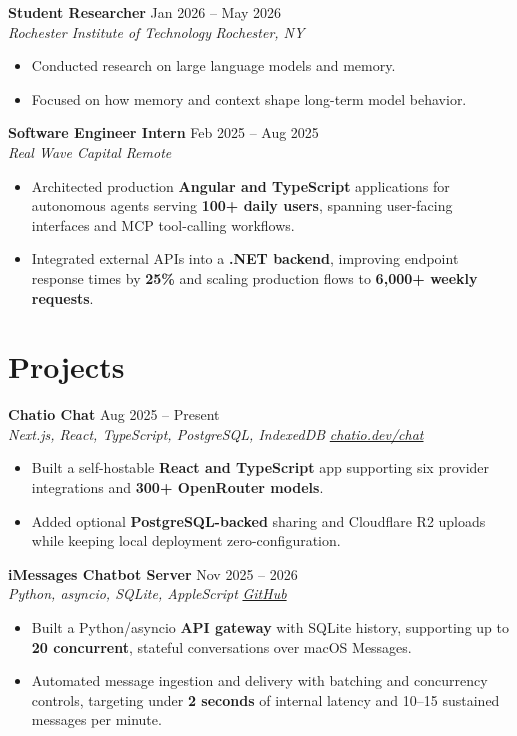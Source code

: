 \documentclass[10pt,letterpaper]{article}
\newif\ifresumeFirstRole
\newcommand{\resumeRole}[4]{%
  \ifresumeFirstRole
    \global\resumeFirstRolefalse
  \else
    \vspace{0pt plus 1fill}%
  \fi
  \textbf{#1} \hfill #2\\
  \textit{#3} \hfill \textit{#4}
}
\begin{document}
\resumeRole{Student Researcher}{Jan 2026 -- May 2026}{Rochester Institute of Technology}{Rochester, NY}
\begin{itemize}
  \item Conducted research on large language models and memory.
  \item Focused on how memory and context shape long-term model behavior.
\end{itemize}

\resumeRole{Software Engineer Intern}{Feb 2025 -- Aug 2025}{Real Wave Capital}{Remote}
\begin{itemize}
  \item Architected production \textbf{Angular and TypeScript} applications for autonomous agents serving \textbf{100+ daily users}, spanning user-facing interfaces and MCP tool-calling workflows.
  \item Integrated external APIs into a \textbf{.NET backend}, improving endpoint response times by \textbf{25\%} and scaling production flows to \textbf{6,000+ weekly requests}.
\end{itemize}

\section*{Projects}
\resumeRole{Chatio Chat}{Aug 2025 -- Present}{Next.js, React, TypeScript, PostgreSQL, IndexedDB}{\href{https://chatio.dev/chat}{chatio.dev/chat}}
\begin{itemize}
  \item Built a self-hostable \textbf{React and TypeScript} app supporting six provider integrations and \textbf{300+ OpenRouter models}.
  \item Added optional \textbf{PostgreSQL-backed} sharing and Cloudflare R2 uploads while keeping local deployment zero-configuration.
\end{itemize}

\resumeRole{iMessages Chatbot Server}{Nov 2025 -- 2026}{Python, asyncio, SQLite, AppleScript}{\href{https://github.com/alextyhwang/iMessages-Chatbot-Server}{GitHub}}
\begin{itemize}
  \item Built a Python/asyncio \textbf{API gateway} with SQLite history, supporting up to \textbf{20 concurrent}, stateful conversations over macOS Messages.
  \item Automated message ingestion and delivery with batching and concurrency controls, targeting under \textbf{2 seconds} of internal latency and 10--15 sustained messages per minute.
\end{itemize}
\end{document}
